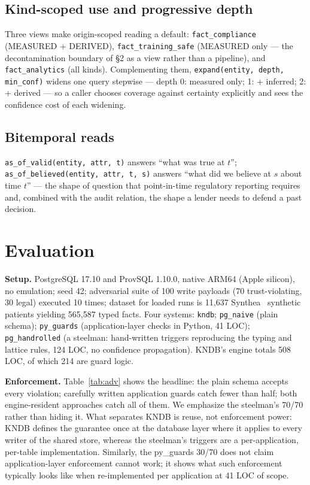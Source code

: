\documentclass[sigconf,nonacm]{acmart}
\begin{document}
\subsection{Kind-scoped use and progressive depth}
Three views make origin-scoped reading a default: \texttt{fact\_compliance} (MEASURED + DERIVED), \texttt{fact\_training\_safe} (MEASURED only --- the decontamination boundary of \S2 as a view rather than a pipeline), and \texttt{fact\_analytics} (all kinds). Complementing them, \texttt{expand(entity, depth, min\_conf)} widens one query stepwise --- depth 0: measured only; 1: + inferred; 2: + derived --- so a caller chooses coverage against certainty explicitly and sees the confidence cost of each widening.

\subsection{Bitemporal reads}
\texttt{as\_of\_valid(entity, attr, t)} answers ``what was true at $t$''; \texttt{as\_of\_believed(entity, attr, t, s)} answers ``what did we believe at $s$ about time $t$'' --- the shape of question that point-in-time regulatory reporting requires~\cite{bcbs} and, combined with the audit relation, the shape a lender needs to defend a past decision.

\section{Evaluation}
\noindent\textbf{Setup.} PostgreSQL 17.10 and ProvSQL 1.10.0, native ARM64 (Apple silicon), no emulation; seed 42; adversarial suite of 100 write payloads (70 trust-violating, 30 legal) executed 10 times; dataset for loaded runs is 11,637 Synthea~\cite{synthea} synthetic patients yielding 565,587 typed facts. Four systems: \texttt{kndb}; \texttt{pg\_naive} (plain schema); \texttt{py\_guards} (application-layer checks in Python, 41 LOC); \texttt{pg\_handrolled} (a steelman: hand-written triggers reproducing the typing and lattice rules, 124 LOC, no confidence propagation). KNDB's engine totals 508 LOC, of which 214 are guard logic.

\noindent\textbf{Enforcement.} Table~\ref{tab:adv} shows the headline: the plain schema accepts every violation; carefully written application guards catch fewer than half; both engine-resident approaches catch all of them. We emphasize the steelman's 70/70 rather than hiding it. What separates KNDB is reuse, not enforcement power: KNDB defines the guarantee once at the database layer where it applies to every writer of the shared store, whereas the steelman's triggers are a per-application, per-table implementation. Similarly, the py\_guards 30/70 does not claim application-layer enforcement cannot work; it shows what such enforcement typically looks like when re-implemented per application at 41 LOC of scope.
\end{document}
